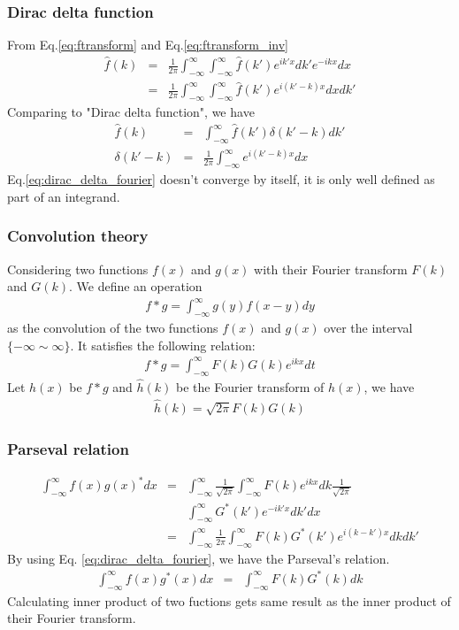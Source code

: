 \documentclass{beamer}
\begin{document}
\begin{frame}
\frametitle{Dirac delta function}
From Eq.\ref{eq:ftransform} and Eq.\ref{eq:ftransform_inv}
\begin{eqnarray}
\hat{f}(k)&=&\frac{1}{2\pi}\int_{-\infty}^{\infty} \int_{-\infty}^{\infty} \hat{f}(k') e^{ik'x} dk' e^{-ikx} dx \nonumber \\
          &=&\frac{1}{2\pi}\int_{-\infty}^{\infty} \int_{-\infty}^{\infty} \hat{f}(k') e^{i(k'-k)x} dx dk' \nonumber
\end{eqnarray}
Comparing to "Dirac delta function", we have
\begin{eqnarray}
\hat{f}(k)&=&\int_{-\infty}^{\infty} \hat{f}(k') \delta{(k'- k)} dk' \nonumber \\
\delta{(k'- k)} &=& \frac{1}{2\pi}\int_{-\infty}^{\infty} e^{i(k'-k)x} dx
\label{eq:dirac_delta_fourier}
\end{eqnarray}
Eq.\ref{eq:dirac_delta_fourier} doesn't converge by itself, it is only well defined as part of an integrand.
\end{frame}
\begin{frame}
\frametitle{Convolution theory}
Considering two functions $f(x)$ and $g(x)$ with their Fourier transform $F(k)$ and $G(k)$. We define an operation
\begin{eqnarray}
f\ast g = \int_{-\infty}^{\infty}g(y)f(x-y)dy
\label{eq:convolution}
\end{eqnarray}
as the convolution of the two functions $f(x)$ and $g(x)$ over the interval $\{ -\infty \sim \infty \}$. It satisfies the following relation:
\begin{eqnarray}
f \ast g = \int_{-\infty}^{\infty}F(k)G(k) e^{ikx}dt
\label{eq:convolution_theorem}
\end{eqnarray}
Let $h(x)$ be $f \ast g$ and $\hat{h}(k)$ be the Fourier transform of $h(x)$, we have
\begin{eqnarray}
\hat{h}(k) = \sqrt{2\pi}F(k)G(k)
\label{eq:convolution_theorem2}
\end{eqnarray}
\end{frame}
\begin{frame}
\frametitle{Parseval relation}
\begin{eqnarray}
\int_{-\infty}^{\infty}f(x)g(x)^* dx &=&\int_{-\infty}^{\infty}  \frac{1}{\sqrt{2\pi}} \int_{-\infty}^{\infty} F(k) e^{ikx}dk \frac{1}{\sqrt{2\pi}} \nonumber \\
&&\int_{-\infty}^{\infty}G^*(k') e^{-ik'x}dk' dx\nonumber \\
&=&\int_{-\infty}^{\infty} \frac{1}{2\pi} \int_{-\infty}^{\infty} F(k)G^*(k')e^{i(k-k')x} dk dk' \nonumber
\end{eqnarray}
By using Eq. \ref{eq:dirac_delta_fourier}, we have the Parseval's relation.
\begin{eqnarray}
\int_{-\infty}^{\infty}f(x)g^*(x) dx &=& \int_{-\infty}^{\infty}F(k)G^*(k)dk
\label{eq:parseval_relation}
\end{eqnarray}
Calculating inner product of two fuctions gets same result as the inner product of their Fourier transform.
\end{frame}
\end{document}
